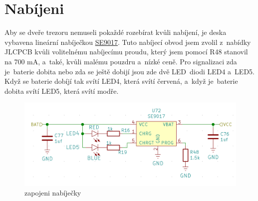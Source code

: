 \section*{Nabíjeni}

Aby se dveře trezoru nemuseli pokaždé rozebírat kvůli nabíjení, je deska vybavena lineární nabíječkou 
\href{https://datasheet.lcsc.com/szlcsc/Seaward-Elec-SE9017-HF_C115752.pdf}{SE9017}. 
Tuto nabíjecí obvod jsem zvolil z~nabídky JLCPCB kvůli volitelnému nabíjecímu proudu, který jsem pomocí R48 stanovil na 700 mA, a~také, kvůli malému 
pouzdru a~nízké ceně.
Pro signalizaci zda je~baterie dobita nebo zda se ještě dobijí jsou zde dvě LED~diodi LED4 a~LED5. Když se baterie dobíjí tak svítí LED4, která svítí 
červená, a~když je~baterie dobita svítí LED5, která svítí modře.

\begin{figure}[htbp]
    \centering
    \includegraphics[width=\textwidth]{kapitoly/obrazky/E4/nabijeni/nabijecka.png}
    \caption{zapojeni nabíječky}
    \label{fig:E4-step-up}
\end{figure}

\newpage
